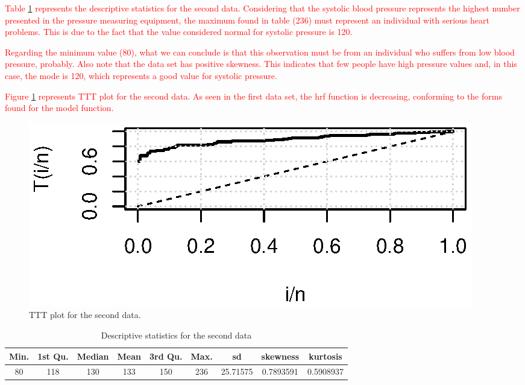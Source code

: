 \documentclass[twoside,leqno,11pt]{article}
\begin{document}
\textcolor{red}{
 Table \ref{tabds2} represents the descriptive statistics for the second data. Considering that the systolic blood pressure represents the highest number presented in the pressure measuring equipment, the maximum found in table (236) must represent an individual with serious heart problems. This is due to the fact that the value considered normal for systolic pressure is 120. } 
 
 \textcolor{red}{Regarding the minimum value (80), what we can conclude is that this observation must be from an individual who suffers from low blood pressure, probably. Also note that the data set has positive skewness. This indicates that few people have high pressure values  and, in this case, the mode is 120, which represents a good value for systolic pressure.
}

 \textcolor{red}{Figure \ref{ttt2} represents TTT plot for the second data. As seen in the first data set, the hrf function is decreasing, conforming to the forms found for the model function.  }

\begin{figure}[H]
\begin{center}
\includegraphics[scale =  1]{ttt2.eps}
\caption{TTT plot for the second data.\label{ttt2}}
\end{center}
\end{figure}

\begin{table}[!htb] 
\scriptsize
\center
\caption{Descriptive statistics for the second data}
\label{tabds2}
\begin{tabular}{ ccccccccc}
\hline\noalign{\smallskip}
   Min. & 1st Qu.&  Median&    Mean& 3rd  Qu.&    Max. & sd &skewness & kurtosis\\
   \hline
 80   &  118    & 130&     133 &    150 &    236  &25.71575 &0.7893591 & 0.5908937\\
\hline
\end{tabular}
\end{table}
\end{document}

